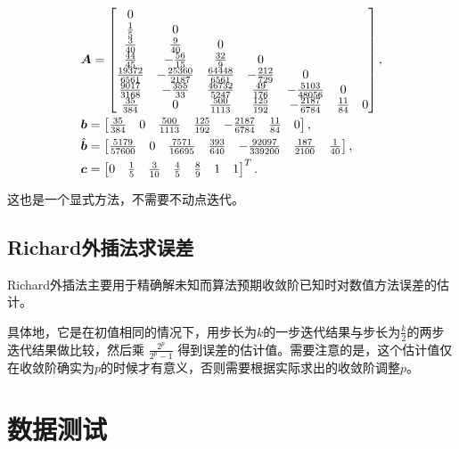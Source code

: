 \documentclass[lang=cn,a4paper,newtx,bibend=bibtex]{elegantpaper}
\begin{document}
\begin{equation*}
\begin{aligned}
    & \bm{A} = \begin{bmatrix} 
        0 & & & & & & \\
        \frac 15 & 0 & & & & & \\
        \frac 3{40} & \frac 9{40} & 0 & & & & \\
        \frac {44}{45} & -\frac{56}{15} & \frac {32}9 & 0 & & & \\
        \frac {19372}{6561} & -\frac{25360}{2187} & \frac{64448}{6561} & -\frac{212}{729} & 0 & & \\
        \frac{9017}{3168} & -\frac{355}{33} & \frac{46732}{5247} & \frac{49}{176} & -\frac{5103}{48056} & 0 & \\
        \frac{35}{384} & 0 & \frac{500}{1113} & \frac{125}{192} & -\frac{2187}{6784} & \frac{11}{84} & 0 \\
     \end{bmatrix},\\
    & \bm{b} = \begin{bmatrix} 
        \frac{35}{384} & 0 & \frac{500}{1113} & \frac{125}{192} & -\frac{2187}{6784} & \frac{11}{84} & 0 \\
     \end{bmatrix},\\
    & \hat{\bm{b}} = \begin{bmatrix} 
        \frac{5179}{57600} & 0 & \frac{7571}{16695} & \frac{393}{640} & -\frac{92097}{339200} & \frac{187}{2100} & \frac 1{40} \\
     \end{bmatrix},\\
    & \bm{c} = \begin{bmatrix} 
        0 & \frac 15 & \frac 3{10} & \frac 45 & \frac 89 & 1 & 1 \\
     \end{bmatrix}^T.
\end{aligned}
\end{equation*}

这也是一个显式方法，不需要不动点迭代。

\subsection{Richard外插法求误差}

Richard外插法主要用于精确解未知而算法预期收敛阶已知时对数值方法误差的估计。

具体地，它是在初值相同的情况下，用步长为$k$的一步迭代结果与步长为$\frac k2$的两步迭代结果做比较，然后乘 $\frac{2^p}{2^p-1}$ 得到误差的估计值。需要注意的是，这个估计值仅在收敛阶确实为$p$的时候才有意义，否则需要根据实际求出的收敛阶调整$p$。

\newpage

\section{数据测试}
\end{document}
